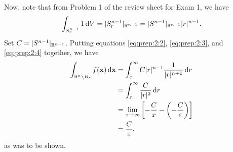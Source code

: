 \begin{solution}
Now, note that from Problem 1 of the review sheet for Exam 1, we have
\begin{equation}
  \label{eq:prep:2:4}
\int_{S_r^{n-1}}1\mathop{}\!\mathrm{d} V=|S_r^{n-1}|_{\mathbb{R}^{n-1}}=|S^{n-1}|_{\mathbb{R}^{n-1}}|r|^{n-1}.
\end{equation}
Set $C=|S^{n-1}|_{\mathbb{R}^{n-1}}$. Putting equations
\eqref{eq:prep:2:2}, \eqref{eq:prep:2:3}, and \eqref{eq:prep:2:4} together,
we have
\begin{equation}
\label{eq:prep:2:5}
\begin{aligned}
\int_{\mathbb{R}^n\setminus B_\varepsilon}f(\mathbf{x})\mathop{}\!\mathrm{d}\mathbf{x}
&=\int_\varepsilon^\infty C|r|^{n-1}\frac{1}{|r|^{n+1}}\mathop{}\!\mathrm{d} r\\
&=\int_\varepsilon^\infty\frac{C}{|r|^2}\mathop{}\!\mathrm{d} r\\
&=\lim_{x\to\infty}\left[-\frac{C}{x}-\left(-\frac{C}{\varepsilon}\right)\right]\\
&=\frac{C}{\varepsilon},
\end{aligned}
\end{equation}
as was to be shown.
\end{solution}

